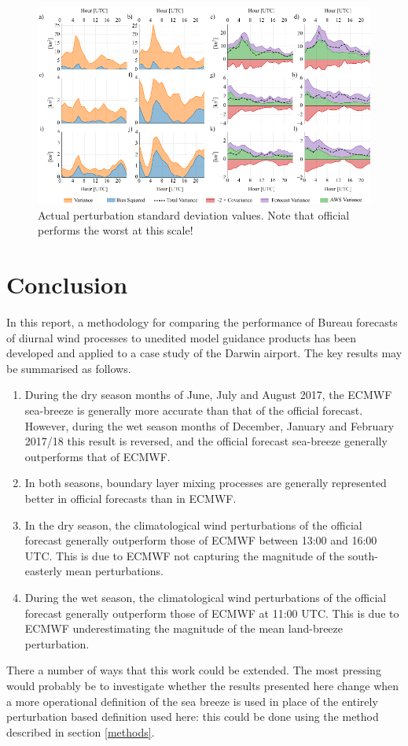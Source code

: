 \documentclass[alpha-refs]{wiley-article}
\begin{document}
\begin{figure}
\centering
\includegraphics{error_decomp_v.pdf}
\caption{Actual perturbation standard deviation values. Note that official performs the worst at this scale!}
\label{Fig:error_decomp_v}
\end{figure}

\section{Conclusion}
\label{conclusion}
In this report, a methodology for comparing the performance of Bureau forecasts of diurnal wind processes to unedited model guidance products has been developed and applied to a case study of the Darwin airport. The key results may be summarised as follows.
\begin{enumerate}
\item
During the dry season months of June, July and August 2017, the ECMWF sea-breeze is generally more accurate than that of the official forecast. However, during the wet season months of December, January and February 2017/18 this result is reversed, and the official forecast sea-breeze generally outperforms that of ECMWF. 
\item
In both seasons, boundary layer mixing processes are generally represented better in official forecasts than in ECMWF.
\item
In the dry season, the climatological wind perturbations of the official forecast generally outperform those of ECMWF between 13:00 and 16:00 UTC. This is due to ECMWF not capturing the magnitude of the south-easterly mean perturbations. 
\item
During the wet season, the climatological wind perturbations of the official forecast generally outperform those of ECMWF at 11:00 UTC. This is due to ECMWF underestimating the magnitude of the mean land-breeze perturbation.
\end{enumerate}

There a number of ways that this work could be extended. The most pressing would probably be to investigate whether the results presented here change when a more operational definition of the sea breeze is used in place of the entirely perturbation based definition used here: this could be done using the method described in section \ref{methods}.


\end{document}
